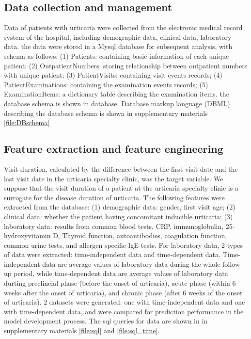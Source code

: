 \documentclass[final,3p,times,authoryear]{elsarticle}
\begin{document}
\subsection{Data collection and management}\label{Data}

Data of patients with urticaria were collected from the electronic medical record system of the hospital, including demographic data, clinical data, laboratory data. 
the data were stored in a Mysql database for subsequent analysis, with schema as follows: (1) Patients: containing basic information of each unique patient; (2) OutpatientNumbers: storing relationship between outpatient numbers with unique patient; (3) PatientVisits: containing visit events records; (4) PatientExaminations: containing the examination events records; (5) ExaminationItems: a dictionary table describing the examination items. the database schema is shown in database. Database markup language (DBML) describing the database schema is shown in supplementary materials \ref{file:DBschema}


\subsection{Feature extraction and feature engineering}\label{FeatureEngineering}
Visit duration, calculated by the difference between the first visit date and the last visit date in the urticaria specialty clinic, was the target variable. We suppose that the visit duration of a patient at the urticaria specialty clinic is a surrogate for the disease duration of urticaria.
The following features were extracted from the database: (1) demographic data: gender, first visit age; (2) clinical data: whether the patient having concomitant inducible urticaria; (3) laboratory data: results from common blood tests, CRP, immunoglobulin, 25-hydroxyvitamin D, Thyroid function, autoantibodies, coagulation function, common urine tests, and allergen specific IgE tests. 
For laboratory data, 2 types of data were extracted: time-independent data and time-dependent data. Time-independent data are average values of laboratory data during the whole follow-up period, while time-dependent data are average values of laboratory data durting preclincial phase (before the onset of urticaria), acute phase (within 6 weeks after the onset of urticaria), and chronic phase (after 6 weeks of the onset of urticaria). 2 datasets were generated: one with time-independent data and one with time-dependent data, and were compared for prediction performance in the model development process. The sql queries for data are shown in in supplementary materials \ref{file:sql} and \ref{file:sql_time}.
\end{document}
